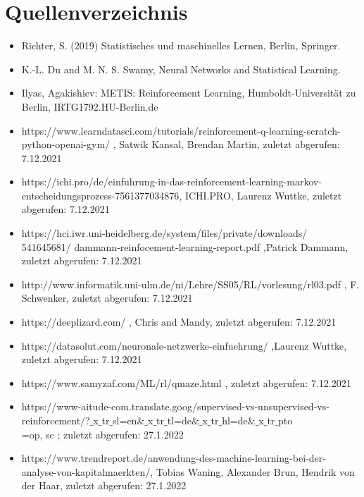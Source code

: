 \documentclass[12pt,titlepage]{article}
\begin{document}
\section{Quellenverzeichnis}
\begin{itemize}
\item Richter, S. (2019) Statistisches und maschinelles Lernen, Berlin, Springer.
\item K.-L. Du and M. N. S. Swamy, Neural Networks and Statistical Learning.
\item Ilyas, Agakishiev: METIS: Reinforcement Learning, Humboldt-Universität zu Berlin, IRTG1792.HU-Berlin.de
\item https://www.learndatasci.com/tutorials/reinforcement-q-learning-scratch-python-openai-gym/ , Satwik Kansal, Brendan Martin, zuletzt abgerufen: 7.12.2021
\item https://ichi.pro/de/einfuhrung-in-das-reinforcement-learning-markov-\\entscheidungsprozess-7561377034876, ICHI.PRO, Laurenz Wuttke, zuletzt abgerufen: 7.12.2021
\item https://hci.iwr.uni-heidelberg.de/system/files/private/downloads/\\541645681/ dammann-reinfocement-learning-report.pdf ,Patrick Dammann, zuletzt abgerufen: 7.12.2021
\item http://www.informatik.uni-ulm.de/ni/Lehre/SS05/RL/vorlesung/rl03.pdf , F. Schwenker, zuletzt abgerufen: 7.12.2021
\item https://deeplizard.com/ , Chris and Mandy, zuletzt abgerufen: 7.12.2021
\item https://datasolut.com/neuronale-netzwerke-einfuehrung/ ,Laurenz Wuttke, zuletzt abgerufen: 7.12.2021
\item https://www.samyzaf.com/ML/rl/qmaze.html , zuletzt abgerufen: 7.12.2021
\item https://www-aitude-com.translate.goog/supervised-vs-unsupervised-vs-\\reinforcement/?$\_$x$\_$tr$\_$sl=en$\& \_$x$\_$tr$\_$tl=de$\& \_$x$\_$tr$\_$hl=de$\& \_$x$\_$tr$\_$pto\\=op, sc ; zuletzt abgerufen: 27.1.2022
\item https://www.trendreport.de/anwendung-des-machine-learning-bei-der-\\analyse-von-kapitalmaerkten/, Tobias Waning, Alexander Brun, Hendrik von der Haar, zuletzt abgerufen: 27.1.2022
\end{itemize}
\end{document}

